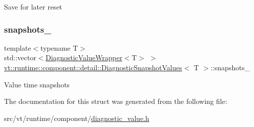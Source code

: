 Save for later reset \mbox{\label{structvt_1_1runtime_1_1component_1_1detail_1_1_diagnostic_snapshot_values_aa88c82ca31224456d8daf7efe44b60fb}} 
\subsubsection{\texorpdfstring{snapshots\+\_\+}{snapshots\_}}
{\footnotesize\ttfamily template$<$typename T$>$ \\
std\+::vector$<$\hyperlink{structvt_1_1runtime_1_1component_1_1detail_1_1_diagnostic_value_wrapper}{Diagnostic\+Value\+Wrapper}$<$T$>$ $>$ \hyperlink{structvt_1_1runtime_1_1component_1_1detail_1_1_diagnostic_snapshot_values}{vt\+::runtime\+::component\+::detail\+::\+Diagnostic\+Snapshot\+Values}$<$ T $>$\+::snapshots\+\_\+\hspace{0.3cm}{\ttfamily [protected]}}

Value time snapshots 

The documentation for this struct was generated from the following file\+:\begin{DoxyCompactItemize}
\item 
src/vt/runtime/component/\hyperlink{diagnostic__value_8h}{diagnostic\+\_\+value.\+h}\end{DoxyCompactItemize}
